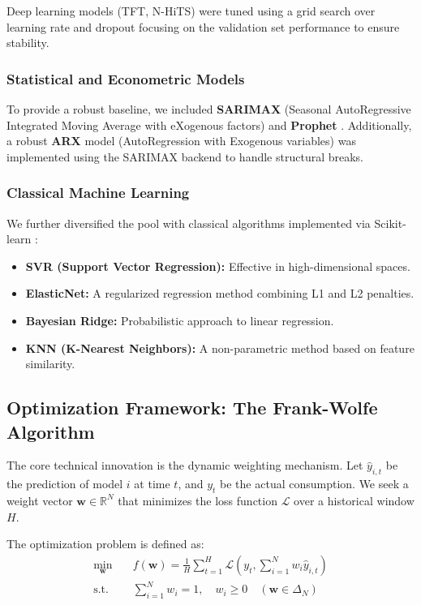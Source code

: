 \documentclass[journal,article,submit,pdftex,moreauthors]{Definitions/mdpi}
\begin{document}
Deep learning models (TFT, N-HiTS) were tuned using a grid search over learning rate and dropout focusing on the validation set performance to ensure stability.

\subsubsection{Statistical and Econometric Models}
To provide a robust baseline, we included \textbf{SARIMAX} (Seasonal AutoRegressive Integrated Moving Average with eXogenous factors) and \textbf{Prophet} \citep{ref_prophet}. Additionally, a robust \textbf{ARX} model (AutoRegression with Exogenous variables) was implemented using the SARIMAX backend to handle structural breaks.

\subsubsection{Classical Machine Learning}
We further diversified the pool with classical algorithms implemented via Scikit-learn \citep{ref_scikit}:
\begin{itemize}
    \item \textbf{SVR (Support Vector Regression):} Effective in high-dimensional spaces.
    \item \textbf{ElasticNet:} A regularized regression method combining L1 and L2 penalties.
    \item \textbf{Bayesian Ridge:} Probabilistic approach to linear regression.
    \item \textbf{KNN (K-Nearest Neighbors):} A non-parametric method based on feature similarity.
\end{itemize}

\subsection{Optimization Framework: The Frank-Wolfe Algorithm}
The core technical innovation is the dynamic weighting mechanism. Let $\hat{y}_{i,t}$ be the prediction of model $i$ at time $t$, and $y_t$ be the actual consumption. We seek a weight vector $\mathbf{w} \in \mathbb{R}^N$ that minimizes the loss function $\mathcal{L}$ over a historical window $H$.

The optimization problem is defined as:
\begin{align}
    \min_{\mathbf{w}} \quad & f(\mathbf{w}) = \frac{1}{H} \sum_{t=1}^H \mathcal{L}\left(y_t, \sum_{i=1}^N w_i \hat{y}_{i,t}\right) \\
    \text{s.t.} \quad & \sum_{i=1}^N w_i = 1, \quad w_i \ge 0 \quad (\mathbf{w} \in \Delta_N)
\end{align}
\end{document}
